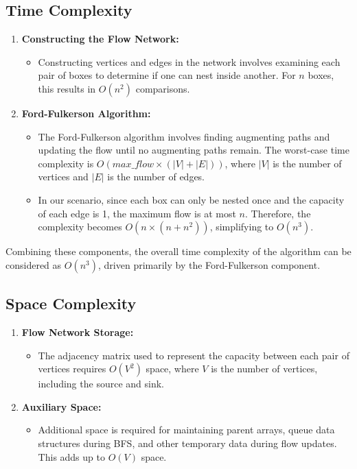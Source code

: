 \documentclass{article}
\begin{document}
    \subsection{Time Complexity}
        \begin{enumerate}
            \item \textbf{Constructing the Flow Network:}
            \begin{itemize}
                \item Constructing vertices and edges in the network involves examining each pair of boxes to determine if one can nest inside another. For \(n\) boxes, this results in \(O(n^2)\) comparisons.
            \end{itemize}
            
            \item \textbf{Ford-Fulkerson Algorithm:}
            \begin{itemize}
                \item The Ford-Fulkerson algorithm involves finding augmenting paths and updating the flow until no augmenting paths remain. The worst-case time complexity is \(O(max\_flow \times (|V| + |E|))\), where \(|V|\) is the number of vertices and \(|E|\) is the number of edges.
                \item In our scenario, since each box can only be nested once and the capacity of each edge is 1, the maximum flow is at most \(n\). Therefore, the complexity becomes \(O(n \times (n + n^2))\), simplifying to \(O(n^3)\).
            \end{itemize}
        \end{enumerate}
        
        Combining these components, the overall time complexity of the algorithm can be considered as \(O(n^3)\), driven primarily by the Ford-Fulkerson component.
    
    \subsection{Space Complexity}
        \begin{enumerate}
            \item \textbf{Flow Network Storage:}
            \begin{itemize}
                \item The adjacency matrix used to represent the capacity between each pair of vertices requires \(O(V^2)\) space, where \(V\) is the number of vertices, including the source and sink.
            \end{itemize}
            
            \item \textbf{Auxiliary Space:}
            \begin{itemize}
                \item Additional space is required for maintaining parent arrays, queue data structures during BFS, and other temporary data during flow updates. This adds up to \(O(V)\) space.
            \end{itemize}
        \end{enumerate}
        
\end{document}
